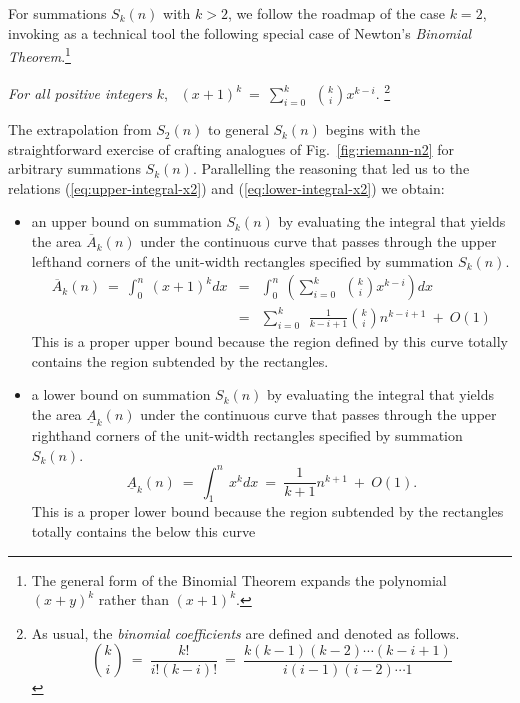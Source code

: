 \documentclass{article}
\begin{document}
\begin{itemize}
\medskip

For summations $S_k(n)$ with $k >2$, we follow the roadmap of the case
$k=2$, invoking as a technical tool the following special case of
Newton's {\it Binomial Theorem}.\footnote{The general form of the
  Binomial Theorem expands the polynomial $(x+y)^k$ rather than
  $(x+1)^k$.}

\bigskip

{\em
For all positive integers} $k$, \
$\displaystyle (x+1)^k \ = \
\sum_{i=0}^k \ \ {k \choose i} x^{k-i}$.
\footnote{
As usual, the {\it binomial coefficients} are defined and denoted as
follows.
\[
{k \choose i} \ = \ \frac{k!}{i!(k-i)!} \ = \
\frac{k(k-1)(k-2) \cdots (k-i+1)}{i(i-1)(i-2) \cdots 1}
\]}

The extrapolation from $S_2(n)$ to general $S_k(n)$ begins with the
straightforward exercise of crafting analogues of
Fig.~\ref{fig:riemann-n2} for arbitrary summations $S_k(n)$.
Parallelling the reasoning that led us to the relations
(\ref{eq:upper-integral-x2}) and (\ref{eq:lower-integral-x2}) we
obtain:
\begin{itemize}
\item
an upper bound on summation $S_k(n)$ by evaluating the integral that
yields the area $\overline{A}_k(n)$ under the continuous curve that
passes through the upper lefthand corners of the unit-width rectangles
specified by summation $S_k(n)$.
\begin{eqnarray}
\label{eq:upper-integral-xk}
\overline{A}_k(n) \ = \
\int_0^n \ (x+1)^k dx & = &
\int_0^n \ \left(
\sum_{i=0}^k \ \ {k \choose i} x^{k-i} \right) dx \\
\nonumber
  & = &
\sum_{i=0}^k \ \ \frac{1}{k-i+1} {k \choose i} n^{k-i+1} \ + \ O(1)
\end{eqnarray}
This is a proper upper bound because the region defined by this curve
totally contains the region subtended by the rectangles.

\item
a lower bound on summation $S_k(n)$ by evaluating the integral that
yields the area $\underline{A}_k(n)$ under the continuous curve that
passes through the upper righthand corners of the unit-width
rectangles specified by summation $S_k(n)$.
\begin{equation}
\label{eq:lower-integral-xk}
\underline{A}_k(n) \ = \ 
\int_1^n \ x^k dx \ = \ \frac{1}{k+1} n^{k+1} \ + \ O(1).
\end{equation}
This is a proper lower bound because the region subtended by the
rectangles totally contains the below this curve
\end{itemize}


\end{itemize}
\end{document}
